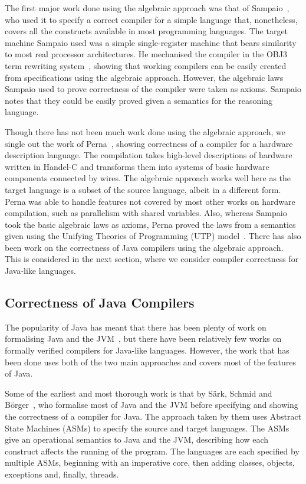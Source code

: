 \documentclass[a4paper,10pt]{report}
\begin{document}
The first major work done using the algebraic approach was that of
Sampaio~\cite{sampaio1993}, who used it to specify a correct compiler for a
simple language that, nonetheless, covers all the constructs available in most
programming languages. The target machine Sampaio used was a simple
single-register machine that bears similarity to most real processor
architectures.  He mechanised the compiler in the OBJ3 term rewriting
system~\cite{goguen1988}, showing that working compilers can be easily created
from specifications using the algebraic approach.  However, the algebraic laws
Sampaio used to prove correctness of the compiler were taken as axioms. Sampaio
notes that they could be easily proved given a semantics for the reasoning
language.

Though there has not been much work done using the algebraic approach, we single
out the work of Perna~\cite{perna2010, perna2011}, showing correctness of a
compiler for a hardware description language.  The compilation takes high-level
descriptions of hardware written in Handel-C and transforms them into systems of
basic hardware components connected by wires.  The algebraic approach works well
here as the target language is a subset of the source language, albeit in a
different form.  Perna was able to handle features not covered by most other
works on hardware compilation, such as parallelism with shared variables.  Also,
whereas Sampaio took the basic algebraic laws as axioms, Perna proved the laws
from a semantics given using the Unifying Theories of Programming (UTP)
model~\cite{hoare1998}.  There has also been work on the correctness of Java
compilers using the algebraic approach.  This is considered in the next section,
where we consider compiler correctness for Java-like languages.

\subsection{Correctness of Java Compilers}
\label{java-compiler-correctness-subsection}

The popularity of Java has meant that there has been plenty of work on
formalising Java and the JVM~\cite{hartel2001}, but there have been relatively
few works on formally verified compilers for Java-like languages.  However, the
work that has been done uses both of the two main approaches and covers most of
the features of Java.

Some of the earliest and most thorough work is that by S\"{a}rk, Schmid and
B\"{o}rger~\cite{stark2001}, who formalise most of Java and the JVM before
specifying and showing the correctness of a compiler for Java.  The approach
taken by them uses Abstract State Machines (ASMs) to specify the source and
target languages.  The ASMs give an operational semantics to Java and the JVM,
describing how each construct affects the running of the program.  The languages
are each specified by multiple ASMs, beginning with an imperative core, then
adding classes, objects, exceptions and, finally, threads.
\end{document}
